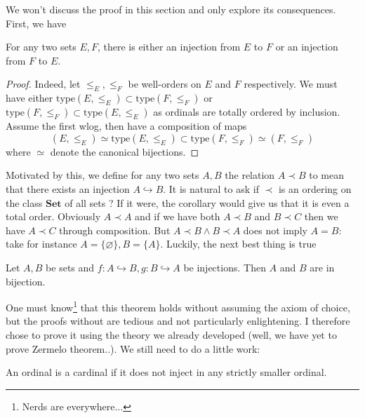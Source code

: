 \documentclass{article}
\begin{document}
We won't discuss the proof in this section and only explore its consequences. First, we have
\begin{corollary}
    For any two sets $E, F$, there is either an injection from $E$ to $F$ or an injection from $F$ to $E$.
\end{corollary}
\begin{proof}
    Indeed, let $\leq_E, \leq_F$ be well-orders on $E$ and $F$ respectively. We must have either $\mathrm{type}(E, \leq_E) \subset \mathrm{type}(F, \leq_F)$ or $\mathrm{type}(F, \leq_F) \subset \mathrm{type}(E, \leq_E)$ as ordinals are totally ordered by inclusion. Assume the first wlog, then have a composition of maps
    $$(E, \leq_E) \simeq \mathrm{type}(E, \leq_E) \subset \mathrm{type}(F, \leq_F) \simeq (F, \leq_F) $$
    where $\simeq$ denote the canonical bijections.
\end{proof}

Motivated by this, we define for any two sets $A, B$ the relation $A \prec B$ to mean that there exists an injection $A \hookrightarrow B$. It is natural to ask if $\prec$ is an ordering on the class $\mathbf{Set}$ of all sets ? If it were, the corollary would give us that it is even a total order. Obviously $A \prec A$ and if we have both $A \prec B$ and $B \prec C$ then we have $A \prec C$ through composition. But $A \prec B \land B \prec A$ does not imply $A = B$: take for instance $A = \{\varnothing\}, B = \{A\}$. Luckily, the next best thing is true

\begin{theorem}
    Let $A, B$ be sets and $f: A \hookrightarrow B, g: B \hookrightarrow A$ be injections. Then $A$ and $B$ are in bijection.
\end{theorem}

One must know\footnote{Nerds are everywhere...} that this theorem holds without assuming the axiom of choice, but the proofs without are tedious and not particularly enlightening. I therefore chose to prove it using the theory we already developed (well, we have yet to prove Zermelo theorem..). We still need to do a little work:
\begin{definition}
    An ordinal is a cardinal if it does not inject in any strictly smaller ordinal.
\end{definition}
\end{document}
